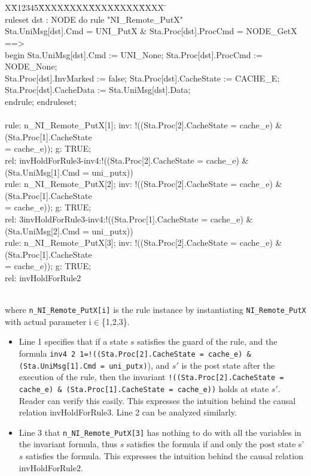 \documentclass{llncs}
\newlength{\fminilength}
\newenvironment{fmini}[1][\linewidth]
  {\setlength{\fminilength}{#1\fboxsep-2\fboxrule}%
   \vspace{2ex}\noindent\begin{lrbox}{\fminibox}\begin{minipage}{\fminilength}%
   \mbox{ }\hfill\vspace{-2.5ex}}%
  {\end{minipage}\end{lrbox}\vspace{1ex}\hspace{0ex}%
   \framebox{\usebox{\fminibox}}}
\newenvironment{specification}
{\noindent\scriptsize
\tt\begin{fmini}\begin{tabbing}X\=X12345\=XXXX\=XXXX\=XXXX\=XXXX\=XXXX
\=\+\kill} {\end{tabbing}\normalfont\end{fmini}}
\begin{document}
\begin{specification}\\
ruleset dst : NODE do rule "NI\_Remote\_PutX"\\
  Sta.UniMsg[dst].Cmd = UNI\_PutX \&  Sta.Proc[dst].ProcCmd = NODE\_GetX\\
==>\\
begin   Sta.UniMsg[dst].Cmd := UNI\_None;  Sta.Proc[dst].ProcCmd := NODE\_None;\\
  Sta.Proc[dst].InvMarked := false;   Sta.Proc[dst].CacheState := CACHE\_E;\\
  Sta.Proc[dst].CacheData := Sta.UniMsg[dst].Data;\\
endrule; endruleset;\\\\
rule: n\_NI\_Remote\_PutX[1]; inv: !((Sta.Proc[2].CacheState = cache\_e) \& (Sta.Proc[1].CacheState\\ = cache\_e)); g: TRUE; \\
rel: invHoldForRule3-inv4:!((Sta.Proc[2].CacheState = cache\_e) \& (Sta.UniMsg[1].Cmd = uni\_putx))\\
rule: n\_NI\_Remote\_PutX[2]; inv: !((Sta.Proc[2].CacheState = cache\_e) \& (Sta.Proc[1].CacheState\\ = cache\_e)); g: TRUE; \\
rel: 3invHoldForRule3-inv4:!((Sta.Proc[1].CacheState = cache\_e) \& (Sta.UniMsg[2].Cmd = uni\_putx))\\
rule: n\_NI\_Remote\_PutX[3]; inv: !((Sta.Proc[2].CacheState = cache\_e) \& (Sta.Proc[1].CacheState\\ = cache\_e)); g: TRUE;\\
 rel: invHoldForRule2\\
\end{specification}\\

where {\tt n\_NI\_Remote\_PutX[i]} is the rule instance by instantiating {\tt NI\_Remote\_PutX} with actual parameter i$\in$\{1,2,3\}.
\begin{itemize}
\item Line 1 specifies that if a state $s$ satisfies the guard of the rule, and the formula {\tt inv4 2 1=!((Sta.Proc[2].CacheState = cache\_e) \& (Sta.UniMsg[1].Cmd = uni\_putx)}), and $s'$ is the post state after the execution of the rule, then the invariant {\tt !((Sta.Proc[2].CacheState = cache\_e) \& (Sta.Proc[1].CacheState = cache\_e))} holds at state $s'$. Reader can verify this easily. This expresses the intuition behind the causal relation invHoldForRule3. Line 2 can be analyzed similarly.
 \item Line 3 that {\tt n\_NI\_Remote\_PutX[3]} has nothing to do with all the variables in the invariant formula, thus $s$ satisfies the formula if and only the post state s'  $s$ satisfies the formula. This expresses the intuition behind the causal relation invHoldForRule2.
\end{itemize}
\end{document}
